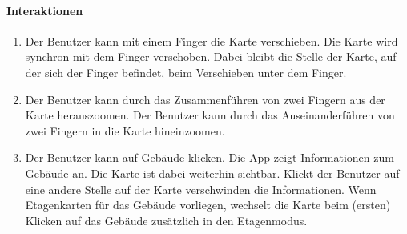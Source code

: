 \paragraph{Interaktionen}
\begin{enumerate}
    \item Der Benutzer kann mit einem Finger die Karte verschieben. Die Karte wird synchron mit dem Finger verschoben. Dabei bleibt die Stelle der Karte, auf der sich der Finger befindet, beim Verschieben unter dem Finger.
    \item Der Benutzer kann durch das Zusammenführen von zwei Fingern aus der Karte herauszoomen. Der Benutzer kann durch das Auseinanderführen von zwei Fingern in die Karte hineinzoomen.
    \item Der Benutzer kann auf Gebäude klicken. Die App zeigt Informationen zum Gebäude an. Die Karte ist dabei weiterhin sichtbar. Klickt der Benutzer auf eine andere Stelle auf der Karte verschwinden die Informationen. Wenn Etagenkarten für das Gebäude vorliegen, wechselt die Karte beim (ersten) Klicken auf das Gebäude zusätzlich in den Etagenmodus.
\end{enumerate}